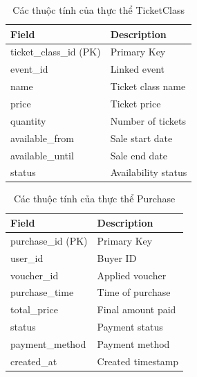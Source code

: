 \begin{table}[H]
\centering
\begin{tabular}{|p{4.5cm}|p{6cm}|}
\hline
\textbf{Field} & \textbf{Description} \\ \hline
ticket\_class\_id (PK) & Primary Key \\ \hline
event\_id & Linked event \\ \hline
name & Ticket class name \\ \hline
price & Ticket price \\ \hline
quantity & Number of tickets \\ \hline
available\_from & Sale start date \\ \hline
available\_until & Sale end date \\ \hline
status & Availability status \\ \hline
\end{tabular}
\vspace{15pt}
\caption{Các thuộc tính của thực thể TicketClass}
\end{table}

\begin{table}[H]
\centering
\begin{tabular}{|p{4.5cm}|p{6cm}|}
\hline
\textbf{Field} & \textbf{Description} \\ \hline
purchase\_id (PK) & Primary Key \\ \hline
user\_id & Buyer ID \\ \hline
voucher\_id & Applied voucher \\ \hline
purchase\_time & Time of purchase \\ \hline
total\_price & Final amount paid \\ \hline
status & Payment status \\ \hline
payment\_method & Payment method \\ \hline
created\_at & Created timestamp \\ \hline
\end{tabular}
\vspace{15pt}
\caption{Các thuộc tính của thực thể Purchase}
\end{table}

